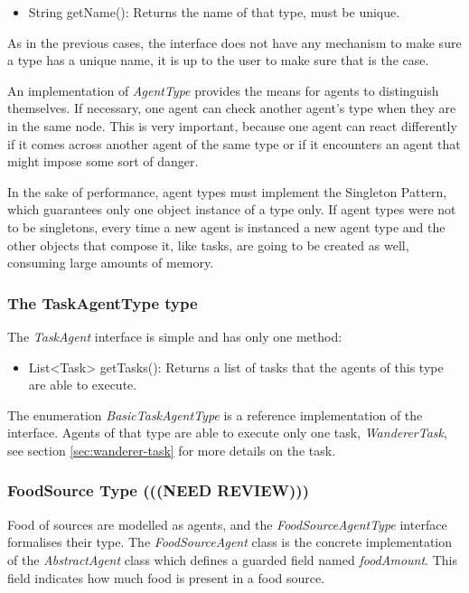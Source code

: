 \begin{itemize}
  \item String getName(): Returns the name of that type, must be unique.
\end{itemize}

As in the previous cases, the interface does not have any mechanism to make sure a type has a unique name, it is up to the user to make sure that is the case.

An implementation of \emph{AgentType} provides the means for agents to distinguish themselves. If necessary, one agent can check another agent’s type when they are in the same node. This is very important, because one agent can react differently if it comes across another agent of the same type or if it encounters an agent that might impose some sort of danger.

In the sake of performance, agent types must implement the Singleton Pattern, which guarantees only one object instance of a type only.\cite{bloch2008effective} If agent types were not to be singletons, every time a new agent is instanced a new agent type and the other objects that compose it, like tasks, are going to be created as well, consuming large amounts of memory. 

\subsubsection{The TaskAgentType type}
\label{sec:taskagentype}

The \emph{TaskAgent} interface is simple and has only one method:

\begin{itemize}
  \item List<Task> getTasks(): Returns a list of tasks that the agents of this type are able to execute.
\end{itemize}

The enumeration \emph{BasicTaskAgentType} is a reference implementation of the interface. Agents of that type are able to execute only one task, \emph{WandererTask}, see section \ref{sec:wanderer-task} for more details on the task.

\subsubsection{FoodSource Type (((NEED REVIEW)))}

Food of sources are modelled as agents, and the \emph{FoodSourceAgentType} interface formalises their type. The \emph{FoodSourceAgent} class is the concrete implementation of the \emph{AbstractAgent} class which defines a guarded field named \emph{foodAmount}. This field indicates how much food is present in a food source.

